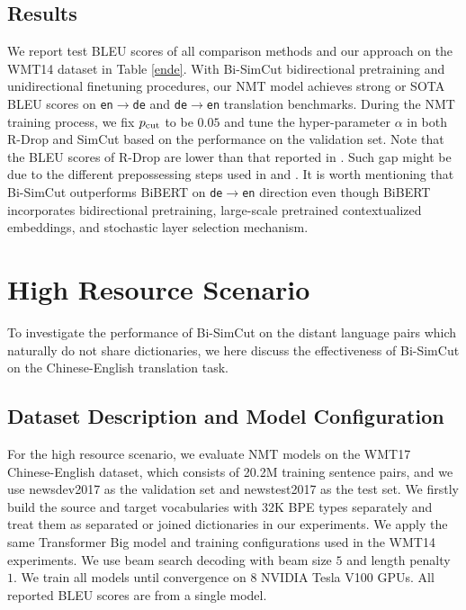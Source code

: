 \documentclass[11pt]{article}
\begin{document}
\subsection{Results}

We report test BLEU scores of all comparison methods and our approach on the WMT14 dataset in Table \ref{ende}. With Bi-SimCut bidirectional pretraining and unidirectional finetuning procedures, our NMT model achieves strong or SOTA BLEU scores on \texttt{en}$\rightarrow$\texttt{de} and \texttt{de}$\rightarrow$\texttt{en} translation benchmarks. During the NMT training process, we fix $p_{\rm cut}$ to be $0.05$ and tune the hyper-parameter $\alpha$ in both R-Drop and SimCut based on the performance on the validation set. Note that the BLEU scores of R-Drop are lower than that reported in \citet{liang2021r}. Such gap might be due to the different prepossessing steps used in \citet{liang2021r} and \citet{xu-etal-2021-bert}. It is worth mentioning that Bi-SimCut outperforms BiBERT on \texttt{de}$\rightarrow$\texttt{en} direction even though BiBERT incorporates bidirectional pretraining, large-scale pretrained contextualized embeddings, and stochastic layer selection mechanism.


\section{High Resource Scenario}\label{high-resource}

To investigate the performance of Bi-SimCut on the distant language pairs which naturally do not share dictionaries, we here discuss the effectiveness of Bi-SimCut on the Chinese-English translation task.

\subsection{Dataset Description and Model Configuration}

For the high resource scenario, we evaluate NMT models on the WMT17 Chinese-English dataset, which consists of 20.2M training sentence pairs, and we use newsdev2017 as the validation set and newstest2017 as the test set. We firstly build the source and target vocabularies with 32K BPE types separately and treat them as separated or joined dictionaries in our experiments. We apply the same Transformer Big model and training configurations used in the WMT14 experiments. We use beam search decoding with beam size $5$ and length penalty $1$. We train all models until convergence on 8 NVIDIA Tesla V100 GPUs. All reported BLEU scores are from a single model. 
\end{document}
